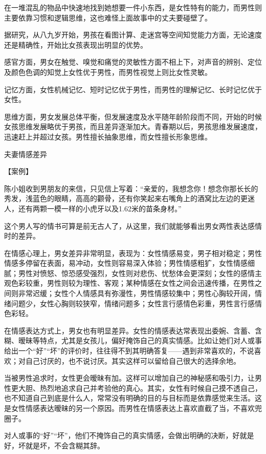 \documentclass[12pt,UTF8,openany]{ctexbook}
\begin{document}
在一堆混乱的物品中快速地找到她想要一件小东西，是女性特有的能力，而男性则主要依靠习惯和逻辑思维，这也难怪上面故事中的丈夫要碰壁了。

据研究，从八九岁开始，男孩在看图计算、走迷宫等空间知觉能力方面，无论速度还是精确性，开始比女孩表现出明显的优势。

感官方面，男女在触觉、嗅觉和痛觉的灵敏性方面不相上下，对声音的辨别、定位及颜色色调的知觉上女性优于男性，而男性视觉上则比女性灵敏。

记忆方面，女性机械记忆、短时记忆优于男性，而男性的理解记忆、长时记忆优于女性。

思维方面，男女发展总体平衡，但发展速度及水平随年龄阶段而不同，开始的时候女孩思维发展略优于男孩，而且差异逐渐加大。青春期以后，男孩思维发展速度，迅速赶上并超过女孩。男性擅长抽象思维，而女性擅长形象思维。





夫妻情感差异


【案例】

陈小姐收到男朋友的来信，只见信上写着：“亲爱的，我想念你！想念你那长长的秀发，浅蓝色的眼睛，高高的颧骨，还有你笑起来右嘴角上的酒窝比左边的更迷人，还有两颗一模一样的小虎牙以及1.62米的苗条身材。”

这个男人写的情书可算是前无古人了，从这里，我们就能够看出男女两性表达感情时的差异。

在情感心理上，男女差异非常明显，表现为：女性情感易变，男子相对稳定；男性情感多停留在表面，易冲动，女性则容易深入体验；男性情感粗犷，女性情感细腻；男性对愤怒、惊恐感受强烈，女性则对悲伤、忧愁体会更深刻；女性的感情主观色彩较重，男性则较为理性、客观；某种情感在女性之间会迅速传播，在男性之间则非常迟缓；女性个人情感具有弥漫性，男性情感较集中；男性心胸较开阔，情绪问题少，女性心胸则较狭窄，情绪问题多；女性言行感情色彩重，男性言行感情色彩轻。

在情感表达方式上，男女也有明显差异。女性的情感表达常表现出委婉、含蓄、含糊、暧昧等特点，尤其是女孩儿，偏好掩饰自己的真实情感。比如让她们对人或事给出一个“好”“坏”的评价时，往往得不到其明确答复——遇到非常喜欢的，不说喜欢；对自己讨厌的，也不说讨厌。其实这样可以留给自己很大的选择余地。

当被男性追求时，女性更会暧昧有加。这样可以增加自己的神秘感和吸引力，让男性更大胆、热烈地追求自己并考验他的真心。其实，女性有时候自己摸不透自己，也不知道自己到底是什么人，常常没有明确的目的与目标而是依靠感觉来生活。这是女性情感表达暧昧的另一个原因。而男性在情感表达上喜欢直截了当，不喜欢兜圈子。

对人或事的“好”“坏”，他们不掩饰自己的真实情感，会做出明确的决断，好就是好，坏就是坏，不会含糊其辞。
\end{document}
